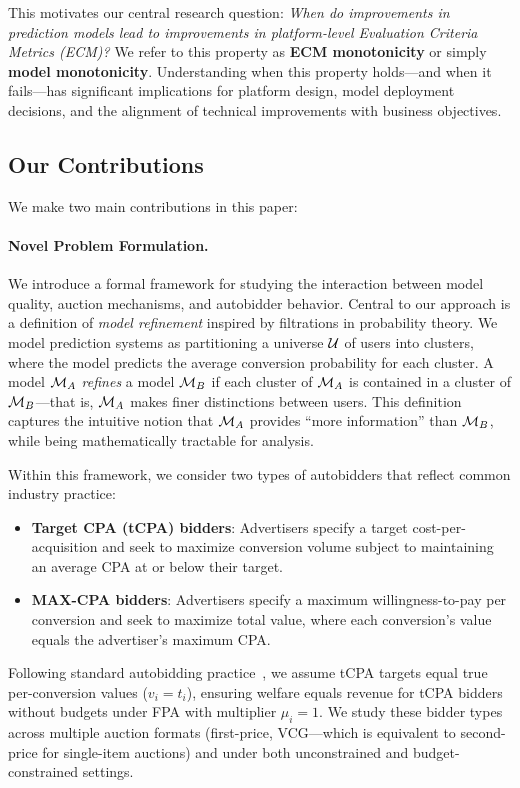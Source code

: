 This motivates our central research question: \emph{When do improvements in prediction models lead to improvements in platform-level Evaluation Criteria Metrics (ECM)?} We refer to this property as \textbf{ECM monotonicity} or simply \textbf{model monotonicity}. Understanding when this property holds---and when it fails---has significant implications for platform design, model deployment decisions, and the alignment of technical improvements with business objectives.

\subsection{Our Contributions}

We make two main contributions in this paper:

\paragraph{Novel Problem Formulation.} We introduce a formal framework for studying the interaction between model quality, auction mechanisms, and autobidder behavior. Central to our approach is a definition of \emph{model refinement} inspired by filtrations in probability theory. We model prediction systems as partitioning a universe $\mathcal{U}$ of users into clusters, where the model predicts the average conversion probability for each cluster. A model $\mathcal{M}_A$ \emph{refines} a model $\mathcal{M}_B$ if each cluster of $\mathcal{M}_A$ is contained in a cluster of $\mathcal{M}_B$---that is, $\mathcal{M}_A$ makes finer distinctions between users. This definition captures the intuitive notion that $\mathcal{M}_A$ provides ``more information'' than $\mathcal{M}_B$, while being mathematically tractable for analysis.

Within this framework, we consider two types of autobidders that reflect common industry practice:
\begin{itemize}
    \item \textbf{Target CPA (tCPA) bidders}: Advertisers specify a target cost-per-acquisition and seek to maximize conversion volume subject to maintaining an average CPA at or below their target.
    \item \textbf{MAX-CPA bidders}: Advertisers specify a maximum willingness-to-pay per conversion and seek to maximize total value, where each conversion's value equals the advertiser's maximum CPA.
\end{itemize}
Following standard autobidding practice~\citep{aggarwal2024autobidding}, we assume tCPA targets equal true per-conversion values ($v_i = t_i$), ensuring welfare equals revenue for tCPA bidders without budgets under FPA with multiplier $\mu_i = 1$.
We study these bidder types across multiple auction formats (first-price, VCG---which is equivalent to second-price for single-item auctions) and under both unconstrained and budget-constrained settings.

